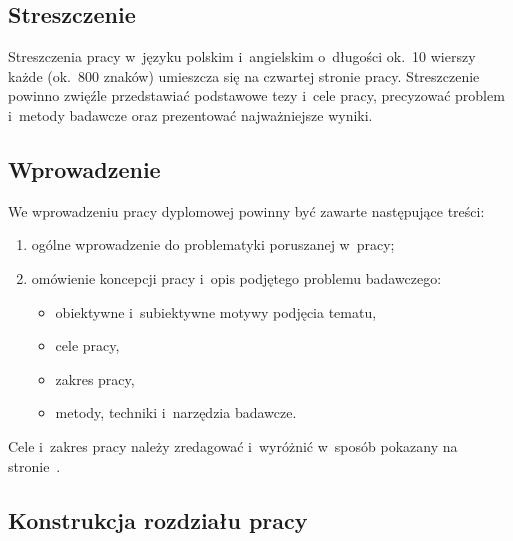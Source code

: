 \documentclass[skorowidz,skroty]{dyplomWEZUT}
\begin{document}
\subsection{Streszczenie}\label{subsec:streszczenie}

Streszczenia pracy w~języku polskim i~angielskim o~długości ok.~10 wierszy każde (ok.~800 znaków) umieszcza się na czwartej stronie pracy. Streszczenie powinno zwięźle przedstawiać podstawowe tezy i~cele pracy, precyzować problem i~metody badawcze oraz prezentować najważniejsze wyniki.

\subsection{Wprowadzenie}\label{subsec:wprowadzenie}

We wprowadzeniu pracy dyplomowej powinny być zawarte następujące treści:

\begin{enumerate}
    \item ogólne wprowadzenie do problematyki poruszanej w~pracy;
    \item omówienie koncepcji pracy i~opis podjętego problemu badawczego:
        \begin{itemize}
            \item obiektywne i~subiektywne motywy podjęcia tematu,
            \item cele pracy,
            \item zakres pracy,
            \item metody, techniki i~narzędzia badawcze.
        \end{itemize}
\end{enumerate}

\noindent Cele i~zakres pracy należy zredagować i~wyróżnić w~sposób pokazany na
stronie~\pageref{cel}.

\subsection{Konstrukcja rozdziału pracy}\label{subsec:konstrukcja}
\end{document}
